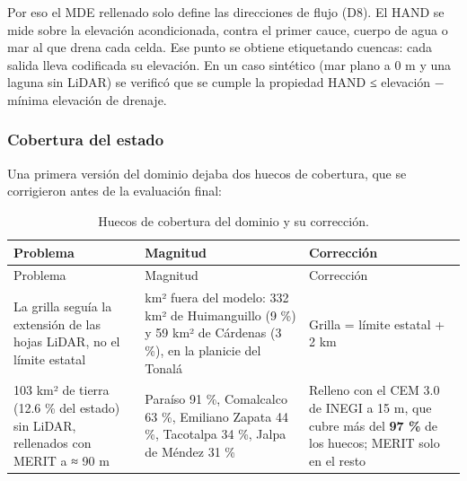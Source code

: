 Por eso el MDE rellenado solo define las direcciones de flujo (D8). El HAND se mide sobre la elevación acondicionada, contra el primer cauce, cuerpo de agua o mar al que drena cada celda. Ese punto se obtiene etiquetando cuencas: cada salida lleva codificada su elevación. En un caso sintético (mar plano a 0 m y una laguna sin LiDAR) se verificó que se cumple la propiedad HAND ≤ elevación − mínima elevación de drenaje.

\subsubsection{Cobertura del estado}

Una primera versión del dominio dejaba dos huecos de cobertura, que se corrigieron antes de la evaluación final:

\begin{longtable}[]{@{}
  >{\raggedright\arraybackslash}p{}
  >{\raggedright\arraybackslash}p{}
  >{\raggedright\arraybackslash}p{}@{}}
\caption{Huecos de cobertura del dominio y su corrección.}\tabularnewline
\toprule\noalign{}
\begin{minipage}[b]{\linewidth}\raggedright
Problema
\end{minipage} & \begin{minipage}[b]{\linewidth}\raggedright
Magnitud
\end{minipage} & \begin{minipage}[b]{\linewidth}\raggedright
Corrección
\end{minipage} \\
\midrule\noalign{}
\endfirsthead
\toprule\noalign{}
\begin{minipage}[b]{\linewidth}\raggedright
Problema
\end{minipage} & \begin{minipage}[b]{\linewidth}\raggedright
Magnitud
\end{minipage} & \begin{minipage}[b]{\linewidth}\raggedright
Corrección
\end{minipage} \\
\midrule\noalign{}
\endhead
\bottomrule\noalign{}
\endlastfoot
La grilla seguía la extensión de las hojas LiDAR, no el límite estatal & 391 km² fuera del modelo: 332 km² de Huimanguillo (9 \%) y 59 km² de Cárdenas (3 \%), en la planicie del Tonalá & Grilla = límite estatal + 2 km \\
3 103 km² de tierra (12.6 \% del estado) sin LiDAR, rellenados con MERIT a ≈ 90 m & Paraíso 91 \%, Comalcalco 63 \%, Emiliano Zapata 44 \%, Tacotalpa 34 \%, Jalpa de Méndez 31 \% & Relleno con el CEM 3.0 de INEGI a 15 m, que cubre más del \textbf{97 \%} de los huecos; MERIT solo en el resto \\
\end{longtable}

